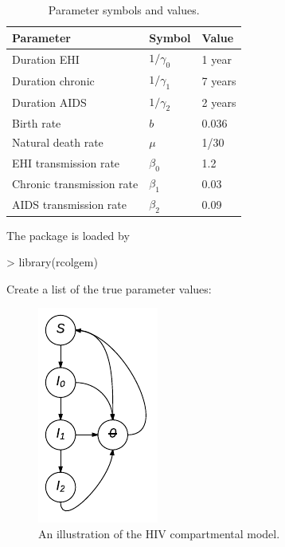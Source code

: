 \documentclass{article}
\begin{document}
\begin{table}
\caption{ Parameter symbols and values. \label{tab:parms} }
\begin{center}
	\begin{tabular}{lll}
		\hline 
		Parameter & Symbol & Value \\
		\hline
		Duration EHI & $1/\gamma_0$ & 1 year \\
		Duration chronic & $1/\gamma_1$ & 7 years \\
		Duration AIDS & $1/\gamma_2$  & 2 years \\
		Birth rate & $b$ & 0.036 \\
		Natural death rate & $\mu$ &  1/30 \\
		EHI transmission rate & $\beta_0$ & 1.2 \\
		Chronic transmission rate & $\beta_1$ & 0.03 \\
		AIDS transmission rate  &  $\beta_2$ & 0.09 \\
		\hline 
	\end{tabular}
\end{center}
\end{table}

The package is loaded by
\begin{Schunk}
\begin{Sinput}
> library(rcolgem)
\end{Sinput}
\end{Schunk}

Create a list of the true parameter values: 

\begin{figure}
\begin{center}
	\includegraphics[width=.4\textwidth]{figure/siiirs.pdf}
\end{center}
	\caption{ An illustration of the HIV compartmental model. \label{fig:hivmodel}}
\end{figure}
\end{document}
